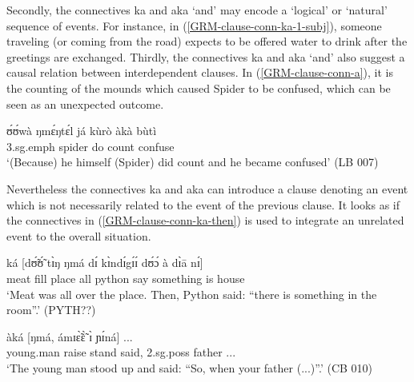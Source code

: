 \z 
 \z


Secondly, the connectives  {\sls ka} and {\sls aka} `and'  may encode a 
`logical' or `natural' sequence of events.   For instance, in 
(\ref{GRM-clause-conn-ka-1-subj}), someone traveling (or coming from the road) 
expects to be offered water to drink after the greetings are exchanged. 
Thirdly, the  connectives  {\sls ka} and {\sls aka} `and' 
 also suggest a causal relation between interdependent clauses. In 
(\ref{GRM-clause-conn-a}), it is the counting of the mounds which caused Spider
to be confused, which can be seen as an unexpected outcome.  




\ea\label{GRM-clause-conn-a} 
\gll   ʊ́ʊ́wà  ŋmɛ́ŋtɛ́l   já  kùrò àkà bùtì\\
{\sc 3.sg.emph}   spider do count  {\conn}  confuse\\
\glt  `(Because) he himself (Spider) did count and he became confused'
(LB  007) 
 \z


Nevertheless the connectives  {\sls ka} and {\sls aka}  can 
introduce a clause denoting an event
which is not necessarily related to the event of the previous clause. It looks
as if  the connectives in (\ref{GRM-clause-conn-ka-then}) is used to
integrate an unrelated event to  the overall situation.   

\ea\label{GRM-clause-conn-ka-then} 
\gll [nànsá sú bárá múŋ̀.] ká [dʊ̃́ʊ̃́ tɪ̀ŋ ŋmá dɪ́ kɪ̀ndɪ́gɪ́ɪ́ 
dʊ́ɔ́ à dɪ̀ā nɪ́]\\
 meat fill place all  {\conn} python {\art} say {\comp} something is  {\art}
house {\postp}\\
\glt `Meat was all over the place. Then,  Python said: ``there is something in
the room''.' (PYTH??)
 \z

\ea\label{GRM-clause-conn-ka-transition} 
\gll  [à  bìpɔ̀lɪ́ɪ́  sìì     tʃɪ́ŋá]  àká   [ŋmá,  
ámɪɛ̃̀ɛ̃̀   ɪ̀      ɲɪ́ná] {...}\\
{\art} young.man   raise   stand {\conn} said,  {\adv}   {\sc 2.sg.poss} 
father  {...}\\
\glt `The young man stood up and said:  ``So, when your father (...)''.' (CB
010)
 \z

